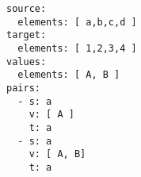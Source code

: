 \begin{verbatim}
source:
  elements: [ a,b,c,d ]
target:
  elements: [ 1,2,3,4 ]
values:
  elements: [ A, B ]
pairs:
  - s: a
    v: [ A ]
    t: a
  - s: a
    v: [ A, B]
    t: a

\end{verbatim}